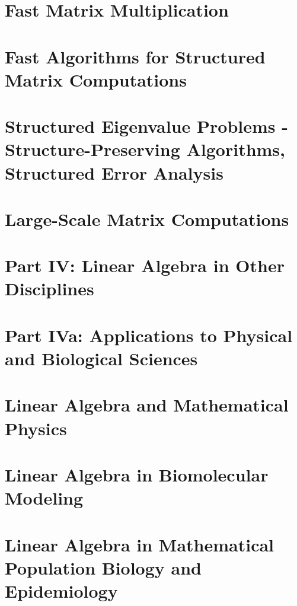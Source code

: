 \documentclass[a4paper]{article}
\begin{document}
\section{Fast Matrix Multiplication}

\section{Fast Algorithms for Structured Matrix Computations}

\section{Structured Eigenvalue Problems - Structure-Preserving Algorithms, 
Structured Error Analysis}

\section{Large-Scale Matrix Computations}

\section*{Part IV: Linear Algebra in Other Disciplines}

\section*{Part IVa: Applications to Physical and Biological Sciences}

\section{Linear Algebra and Mathematical Physics}

\section{Linear Algebra in Biomolecular Modeling}

\section{Linear Algebra in Mathematical Population Biology and Epidemiology}
\end{document}
